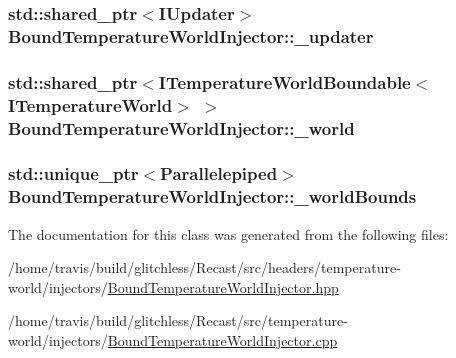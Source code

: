 \hypertarget{class_bound_temperature_world_injector_a1e6c06b5c8ecafe011f27fa69072751e}{
\subsubsection[{\-\_\-updater}]{\setlength{\rightskip}{0pt plus 5cm}std\-::shared\-\_\-ptr$<${\bf I\-Updater}$>$ Bound\-Temperature\-World\-Injector\-::\-\_\-updater\hspace{0.3cm}{\ttfamily [protected]}}}\label{class_bound_temperature_world_injector_a1e6c06b5c8ecafe011f27fa69072751e}
\hypertarget{class_bound_temperature_world_injector_a5917901f6697587dd6dd05b3f1fd0549}{
\subsubsection[{\-\_\-world}]{\setlength{\rightskip}{0pt plus 5cm}std\-::shared\-\_\-ptr$<${\bf I\-Temperature\-World\-Boundable}$<${\bf I\-Temperature\-World}$>$ $>$ Bound\-Temperature\-World\-Injector\-::\-\_\-world\hspace{0.3cm}{\ttfamily [protected]}}}\label{class_bound_temperature_world_injector_a5917901f6697587dd6dd05b3f1fd0549}
\hypertarget{class_bound_temperature_world_injector_a99e1aa88a9e38bddb58c22b030a126c3}{
\subsubsection[{\-\_\-world\-Bounds}]{\setlength{\rightskip}{0pt plus 5cm}std\-::unique\-\_\-ptr$<${\bf Parallelepiped}$>$ Bound\-Temperature\-World\-Injector\-::\-\_\-world\-Bounds\hspace{0.3cm}{\ttfamily [protected]}}}\label{class_bound_temperature_world_injector_a99e1aa88a9e38bddb58c22b030a126c3}


The documentation for this class was generated from the following files\-:\begin{DoxyCompactItemize}
\item 
/home/travis/build/glitchless/\-Recast/src/headers/temperature-\/world/injectors/\hyperlink{_bound_temperature_world_injector_8hpp}{Bound\-Temperature\-World\-Injector.\-hpp}\item 
/home/travis/build/glitchless/\-Recast/src/temperature-\/world/injectors/\hyperlink{_bound_temperature_world_injector_8cpp}{Bound\-Temperature\-World\-Injector.\-cpp}\end{DoxyCompactItemize}
